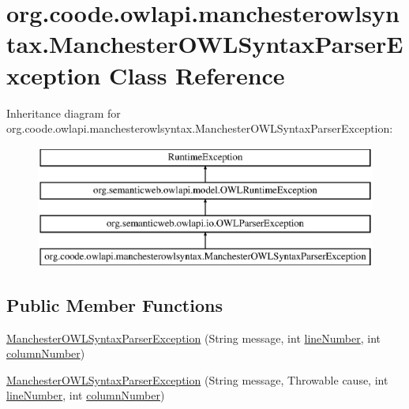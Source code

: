 \hypertarget{classorg_1_1coode_1_1owlapi_1_1manchesterowlsyntax_1_1_manchester_o_w_l_syntax_parser_exception}{\section{org.\-coode.\-owlapi.\-manchesterowlsyntax.\-Manchester\-O\-W\-L\-Syntax\-Parser\-Exception Class Reference}
\label{classorg_1_1coode_1_1owlapi_1_1manchesterowlsyntax_1_1_manchester_o_w_l_syntax_parser_exception}
}
Inheritance diagram for org.\-coode.\-owlapi.\-manchesterowlsyntax.\-Manchester\-O\-W\-L\-Syntax\-Parser\-Exception\-:\begin{figure}[H]
\begin{center}
\leavevmode
\includegraphics[height=4.000000cm]{classorg_1_1coode_1_1owlapi_1_1manchesterowlsyntax_1_1_manchester_o_w_l_syntax_parser_exception}
\end{center}
\end{figure}
\subsection*{Public Member Functions}
\begin{DoxyCompactItemize}
\item 
\hyperlink{classorg_1_1coode_1_1owlapi_1_1manchesterowlsyntax_1_1_manchester_o_w_l_syntax_parser_exception_aebe1b96fb0ae9f61a381fdd044452178}{Manchester\-O\-W\-L\-Syntax\-Parser\-Exception} (String message, int \hyperlink{classorg_1_1semanticweb_1_1owlapi_1_1io_1_1_o_w_l_parser_exception_a5a5d515eefd8c2871627e152d86c03c2}{line\-Number}, int \hyperlink{classorg_1_1semanticweb_1_1owlapi_1_1io_1_1_o_w_l_parser_exception_af0ad50fb6962ba9b17a4e358e1b82d38}{column\-Number})
\item 
\hyperlink{classorg_1_1coode_1_1owlapi_1_1manchesterowlsyntax_1_1_manchester_o_w_l_syntax_parser_exception_adf1381fe83137b5bb72604a98acb6f8a}{Manchester\-O\-W\-L\-Syntax\-Parser\-Exception} (String message, Throwable cause, int \hyperlink{classorg_1_1semanticweb_1_1owlapi_1_1io_1_1_o_w_l_parser_exception_a5a5d515eefd8c2871627e152d86c03c2}{line\-Number}, int \hyperlink{classorg_1_1semanticweb_1_1owlapi_1_1io_1_1_o_w_l_parser_exception_af0ad50fb6962ba9b17a4e358e1b82d38}{column\-Number})
\end{DoxyCompactItemize}
